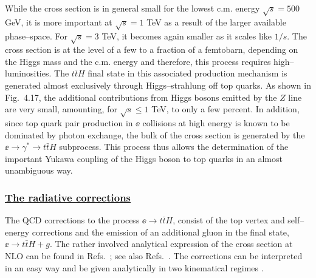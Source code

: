 {\begin{figure}[!h]
\begin{center}
\vspace*{-2.2cm}
\hspace*{-1.cm}
\end{center}
\vspace*{-13.5cm}
\vspace*{-.3cm}
\end{figure}

While the cross section is in general small for the lowest  c.m. energy
$\sqrt{s}=500$ GeV, it is more important at $\sqrt{s}=1$ TeV as a result of the
larger available phase--space. For $\sqrt{s}=3$ TeV, it becomes  again smaller
as it scales like $1/s$. The cross section is at the  level of a few to a
fraction of a femtobarn, depending on the Higgs mass and the  c.m.  energy and
therefore, this process requires high--luminosities.  The $t\bar{t}H$ final
state in this associated production mechanism is generated almost exclusively
through Higgs--strahlung off top quarks. As shown in Fig.~4.17, the additional
contributions from Higgs bosons emitted by the $Z$ line are very small,
amounting, for $\sqrt{s} \leq 1$ TeV,  to only a few percent. In addition,
since top quark pair production in $\ee$ collisions at high energy is known to
be dominated by photon exchange, the bulk of the cross section is generated by
the $\ee \to \gamma^* \to t\bar{t}H$ subprocess.  This process thus allows the
determination of the important Yukawa coupling of the Higgs boson to top quarks
in an almost unambiguous way.

\vspace*{-2mm}
\subsubsection*{\underline{The radiative corrections}}

The QCD corrections to the process  $\ee \to t\bar{t}H$, consist of the top
vertex and self--energy corrections and the emission of an additional gluon in
the final state, $\ee \to t\bar{t}H+g$. The rather involved analytical
expression of the cross section at NLO can be found in
Refs.~\cite{RCTTqcd1,RCTTqcd2}; see also Refs.~\cite{RCTTew1,RCTTew2}. The 
corrections can be interpreted in an easy way and be given analytically in two 
kinematical regimes \cite{RCTTqcd1}.  

}
